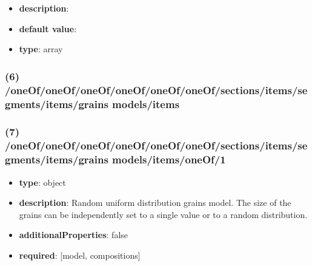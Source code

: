 \begin{itemize}[leftmargin=5em]\item {\bf description}: 
\item {\bf default value}: 
\item {\bf type}: array
\end{itemize}\subsubsection{(6) /oneOf/oneOf/oneOf/oneOf/oneOf/oneOf/sections/items/segments/items/grains models/items}

\subsubsection{(7) /oneOf/oneOf/oneOf/oneOf/oneOf/oneOf/sections/items/segments/items/grains models/items/oneOf/1}
\begin{itemize}[leftmargin=7em]\item {\bf type}: object
\item {\bf description}: Random uniform distribution grains model. The size of the grains can be independently set to a single value or to a random distribution.
\item {\bf additionalProperties}: false
\item {\bf required}: [model, compositions]\end{itemize}
